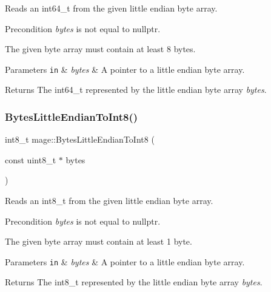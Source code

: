Reads an int64\+\_\+t from the given little endian byte array.

\begin{DoxyPrecond}{Precondition}
{\itshape bytes} is not equal to {\ttfamily nullptr}. 

The given byte array must contain at least 8 bytes. 
\end{DoxyPrecond}

\begin{DoxyParams}[1]{Parameters}
\mbox{\tt in}  & {\em bytes} & A pointer to a little endian byte array. \\
\hline
\end{DoxyParams}
\begin{DoxyReturn}{Returns}
The {\ttfamily int64\+\_\+t} represented by the little endian byte array {\itshape bytes}. 
\end{DoxyReturn}
\hypertarget{namespacemage_a083a2ea889a770925db23c1f514454d9}{}\label{namespacemage_a083a2ea889a770925db23c1f514454d9} 
\subsubsection{\texorpdfstring{Bytes\+Little\+Endian\+To\+Int8()}{BytesLittleEndianToInt8()}}
{\footnotesize\ttfamily int8\+\_\+t mage\+::\+Bytes\+Little\+Endian\+To\+Int8 (\begin{DoxyParamCaption}\item[{const uint8\+\_\+t $\ast$}]{bytes }\end{DoxyParamCaption})}

Reads an int8\+\_\+t from the given little endian byte array.

\begin{DoxyPrecond}{Precondition}
{\itshape bytes} is not equal to {\ttfamily nullptr}. 

The given byte array must contain at least 1 byte. 
\end{DoxyPrecond}

\begin{DoxyParams}[1]{Parameters}
\mbox{\tt in}  & {\em bytes} & A pointer to a little endian byte array. \\
\hline
\end{DoxyParams}
\begin{DoxyReturn}{Returns}
The {\ttfamily int8\+\_\+t} represented by the little endian byte array {\itshape bytes}. 
\end{DoxyReturn}
\hypertarget{namespacemage_aca75f80f9445dd764414522db4967336}{}\label{namespacemage_aca75f80f9445dd764414522db4967336} 
